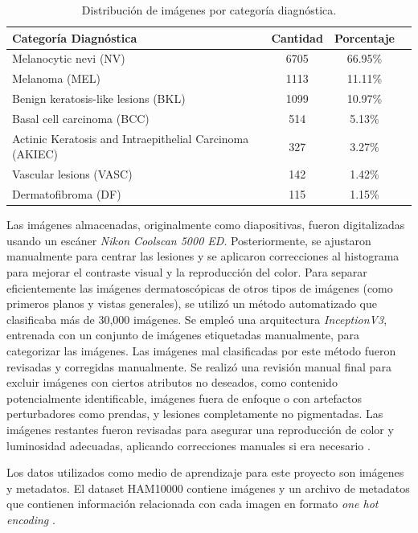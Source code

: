 \begin{table}[ht]
   \centering
   \small
   \begin{tabular}{lccc}
   \hline
   \textbf{Categoría Diagnóstica} & \textbf{Cantidad} & \textbf{Porcentaje} \\
   \hline
   Melanocytic nevi (NV) & 6705 & 66.95\%  \\
   Melanoma (MEL) & 1113 & 11.11\% \\
   Benign keratosis-like lesions (BKL) & 1099 & 10.97\% \\
   Basal cell carcinoma (BCC) & 514 & 5.13\% \\
   Actinic Keratosis and Intraepithelial Carcinoma (AKIEC) & 327                         & 3.27\%              \\
   Vascular lesions (VASC) & 142 & 1.42\%  \\
   Dermatofibroma  (DF) & 115 & 1.15\% \\
   \hline
   \end{tabular}
   \caption{Distribución de imágenes por categoría diagnóstica.}
   \label{tab:ham10000_distribution}
\end{table}   
   
Las imágenes almacenadas, originalmente como diapositivas, fueron digitalizadas usando un escáner \textit{Nikon Coolscan 5000 ED}. Posteriormente, se ajustaron manualmente para centrar las lesiones y se aplicaron correcciones al histograma para mejorar el contraste visual y la reproducción del color. Para separar eficientemente las imágenes dermatoscópicas de otros tipos de imágenes (como primeros planos y vistas generales), se utilizó un método automatizado que clasificaba más de 30,000 imágenes. Se empleó una arquitectura \textit{InceptionV3}, entrenada con un conjunto de imágenes etiquetadas manualmente, para categorizar las imágenes. Las imágenes mal clasificadas por este método fueron revisadas y corregidas manualmente.  Se realizó una revisión manual final para excluir imágenes con ciertos atributos no deseados, como contenido potencialmente identificable, imágenes fuera de enfoque o con artefactos perturbadores como prendas, y lesiones completamente no pigmentadas. Las imágenes restantes fueron revisadas para asegurar una reproducción de color y luminosidad adecuadas, aplicando correcciones manuales si era necesario . 


Los datos utilizados como medio de aprendizaje para este proyecto son imágenes y metadatos. El dataset HAM10000 contiene imágenes y un archivo de metadatos que contienen información relacionada con cada imagen en formato \textit{one hot encoding} .

